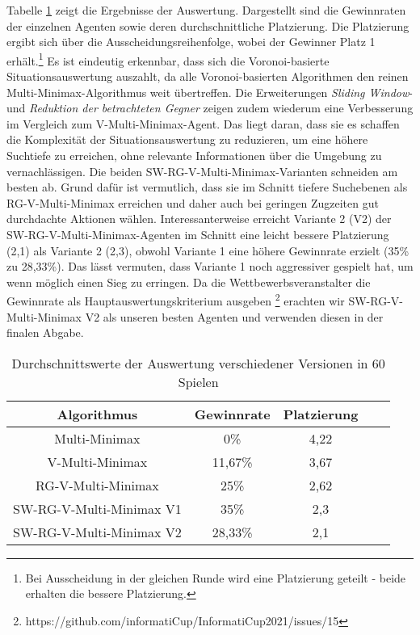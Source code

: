 Tabelle \ref{tab:Versionen} zeigt die Ergebnisse der Auswertung. Dargestellt sind die Gewinnraten der einzelnen Agenten sowie deren durchschnittliche Platzierung. Die Platzierung ergibt sich über die Ausscheidungsreihenfolge, wobei der Gewinner Platz 1 erhält.\footnote{Bei Ausscheidung in der gleichen Runde wird eine Platzierung geteilt - beide erhalten die bessere Platzierung.} Es ist eindeutig erkennbar, dass sich die Voronoi-basierte Situationsauswertung auszahlt, da alle Voronoi-basierten Algorithmen den reinen Multi-Minimax-Algorithmus weit übertreffen. Die Erweiterungen \textit{Sliding Window}- und \textit{Reduktion der betrachteten Gegner} zeigen zudem wiederum eine Verbesserung im Vergleich zum V-Multi-Minimax-Agent. Das liegt daran, dass sie es schaffen die Komplexität der Situationsauswertung zu reduzieren, um eine höhere Suchtiefe zu erreichen, ohne relevante Informationen über die Umgebung zu vernachlässigen. Die beiden SW-RG-V-Multi-Minimax-Varianten schneiden am besten ab. Grund dafür ist vermutlich, dass sie im Schnitt tiefere Suchebenen als RG-V-Multi-Minimax erreichen und daher auch bei geringen Zugzeiten gut durchdachte Aktionen wählen. Interessanterweise erreicht Variante 2 (V2) der SW-RG-V-Multi-Minimax-Agenten im Schnitt eine leicht bessere Platzierung (2,1) als Variante 2 (2,3), obwohl Variante 1 eine höhere Gewinnrate erzielt (35\% zu 28,33\%). Das lässt vermuten, dass Variante 1 noch aggressiver gespielt hat, um wenn möglich einen Sieg zu erringen. Da die Wettbewerbsveranstalter die Gewinnrate als Hauptauswertungskriterium ausgeben \footnote{https://github.com/informatiCup/InformatiCup2021/issues/15} erachten wir SW-RG-V-Multi-Minimax V2 als unseren besten Agenten und verwenden diesen in der finalen Abgabe.

\begin{table}[t]
	\begin{tabular}{|c|c|c|c|c|}
		\hline 
		Algorithmus & Gewinnrate & Platzierung \\
		\hline\hline
		Multi-Minimax & 0\% & 4,22 \\
		\hline 
		V-Multi-Minimax & 11,67\% & 3,67 \\
		\hline 
		RG-V-Multi-Minimax & 25\% & 2,62 \\
		\hline
		SW-RG-V-Multi-Minimax V1 & 35\% & 2,3 \\
		\hline 
		SW-RG-V-Multi-Minimax V2 & 28,33\% & 2,1 \\
		\hline 
	\end{tabular}
	\centering
	\caption[Auswertung verschiedener Versionen]{Durchschnittswerte der Auswertung verschiedener Versionen in 60 Spielen}
	\label{tab:Versionen}
\end{table}
